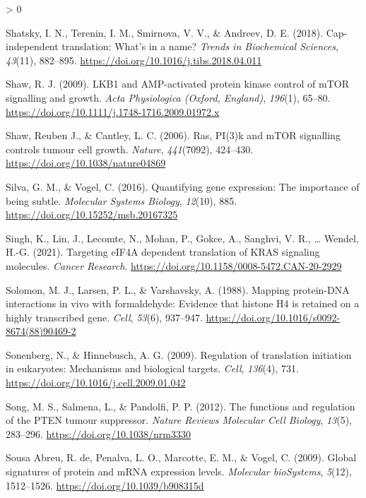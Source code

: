 \documentclass[
  12pt,
  openany]{book}
\newlength{\cslhangindent}
\newenvironment{CSLReferences}[2] %
 {%
  \setlength{\parindent}{0pt}
  \ifodd #1 \everypar{\setlength{\hangindent}{\cslhangindent}}\ignorespaces\fi
  \ifnum #2 > 0
  \setlength{\parskip}{#2\baselineskip}
  \fi
 }%
 {}
\begin{document}
\begin{CSLReferences}{1}{0}
\leavevmode\hypertarget{ref-Shatsky2018}{}%
Shatsky, I. N., Terenin, I. M., Smirnova, V. V., \& Andreev, D. E. (2018). Cap-independent translation: What's in a name? \emph{Trends in Biochemical Sciences}, \emph{43}(11), 882--895. \url{https://doi.org/10.1016/j.tibs.2018.04.011}

\leavevmode\hypertarget{ref-Shaw2009}{}%
Shaw, R. J. (2009). {LKB}1 and {AMP}-activated protein kinase control of {mTOR} signalling and growth. \emph{Acta Physiologica (Oxford, England)}, \emph{196}(1), 65--80. \url{https://doi.org/10.1111/j.1748-1716.2009.01972.x}

\leavevmode\hypertarget{ref-Shaw2006}{}%
Shaw, Reuben J., \& Cantley, L. C. (2006). Ras, {PI}(3)k and {mTOR} signalling controls tumour cell growth. \emph{Nature}, \emph{441}(7092), 424--430. \url{https://doi.org/10.1038/nature04869}

\leavevmode\hypertarget{ref-Silva2016}{}%
Silva, G. M., \& Vogel, C. (2016). Quantifying gene expression: The importance of being subtle. \emph{Molecular Systems Biology}, \emph{12}(10), 885. \url{https://doi.org/10.15252/msb.20167325}

\leavevmode\hypertarget{ref-Singh2021}{}%
Singh, K., Lin, J., Lecomte, N., Mohan, P., Gokce, A., Sanghvi, V. R., \ldots{} Wendel, H.-G. (2021). Targeting {eIF}4A dependent translation of {KRAS} signaling molecules. \emph{Cancer Research}. \url{https://doi.org/10.1158/0008-5472.CAN-20-2929}

\leavevmode\hypertarget{ref-Solomon1988}{}%
Solomon, M. J., Larsen, P. L., \& Varshavsky, A. (1988). Mapping protein-{DNA} interactions in vivo with formaldehyde: Evidence that histone H4 is retained on a highly transcribed gene. \emph{Cell}, \emph{53}(6), 937--947. \url{https://doi.org/10.1016/s0092-8674(88)90469-2}

\leavevmode\hypertarget{ref-Sonenberg2009}{}%
Sonenberg, N., \& Hinnebusch, A. G. (2009). Regulation of translation initiation in eukaryotes: Mechanisms and biological targets. \emph{Cell}, \emph{136}(4), 731. \url{https://doi.org/10.1016/j.cell.2009.01.042}

\leavevmode\hypertarget{ref-Song2012}{}%
Song, M. S., Salmena, L., \& Pandolfi, P. P. (2012). The functions and regulation of the {PTEN} tumour suppressor. \emph{Nature Reviews Molecular Cell Biology}, \emph{13}(5), 283--296. \url{https://doi.org/10.1038/nrm3330}

\leavevmode\hypertarget{ref-deSousaAbreu2009}{}%
Sousa Abreu, R. de, Penalva, L. O., Marcotte, E. M., \& Vogel, C. (2009). Global signatures of protein and {mRNA} expression levels. \emph{Molecular {bioSystems}}, \emph{5}(12), 1512--1526. \url{https://doi.org/10.1039/b908315d}


\end{CSLReferences}
\end{document}
